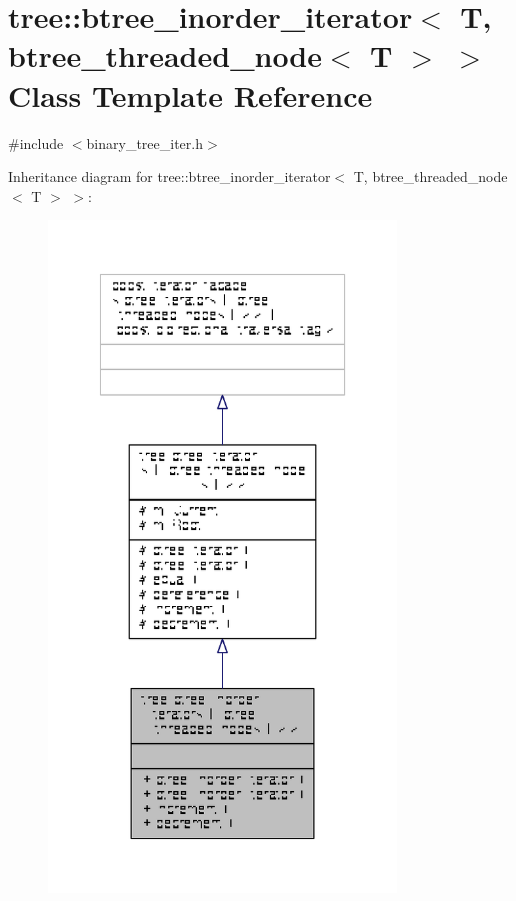 \hypertarget{classtree_1_1btree__inorder__iterator_3_01T_00_01btree__threaded__node_3_01T_01_4_01_4}{\section{tree\-:\-:btree\-\_\-inorder\-\_\-iterator$<$ T, btree\-\_\-threaded\-\_\-node$<$ T $>$ $>$ Class Template Reference}
\label{classtree_1_1btree__inorder__iterator_3_01T_00_01btree__threaded__node_3_01T_01_4_01_4}
}


{\ttfamily \#include $<$binary\-\_\-tree\-\_\-iter.\-h$>$}



Inheritance diagram for tree\-:\-:btree\-\_\-inorder\-\_\-iterator$<$ T, btree\-\_\-threaded\-\_\-node$<$ T $>$ $>$\-:
\nopagebreak
\begin{figure}[H]
\begin{center}
\leavevmode
\includegraphics[width=262pt]{classtree_1_1btree__inorder__iterator_3_01T_00_01btree__threaded__node_3_01T_01_4_01_4__inherit__graph}
\end{center}
\end{figure}


